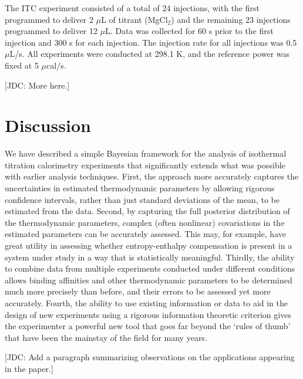 \documentclass[aps,pre,twocolumn,nofootinbib,superscriptaddress,linenumbers]{revtex4-1}
\begin{document}
The ITC experiment consisted of a total of 24 injections, with the first programmed to deliver 2 $\mu$L of titrant (MgCl$_2$) and the remaining 23 injections programmed to deliver 12 $\mu$L.
Data was collected for 60 s prior to the first injection and 300 s for each injection.
The injection rate for all injections was 0.5 $\mu$L/s.
All experiments were conducted at 298.1 K, and the reference power was fixed at 5 $\mu$cal/s.

{\color{red}[JDC: More here.]}

\section{Discussion}
\label{section:discussion}

We have described a simple Bayesian framework for the analysis of isothermal titration calorimetry experiments that significantly extends what was possible with earlier analysis techniques.
First, the approach more accurately captures the uncertainties in estimated thermodynamic parameters by allowing rigorous confidence intervals, rather than just standard deviations of the mean, to be estimated from the data.
Second, by capturing the full posterior distribution of the thermodynamic parameters, complex (often nonlinear) covariations in the estimated parameters can be accurately assessed.
This may, for example, have great utility in assessing whether entropy-enthalpy compensation is present in a system under study in a way that is statistically meaningful.
Thirdly, the ability to combine data from multiple experiments conducted under different conditions allows binding affinities and other thermodynamic parameters to be determined much more precisely than before, and their errors to be assessed yet more accurately.
Fourth, the ability to use existing information or data to aid in the design of new experiments using a rigorous information theoretic criterion gives the experimenter a powerful new tool that goes far beyond the `rules of thumb' that have been the mainstay of the field for many years.

{\color{red}[JDC: Add a paragraph summarizing observations on the applications appearing in the paper.]}
\end{document}
